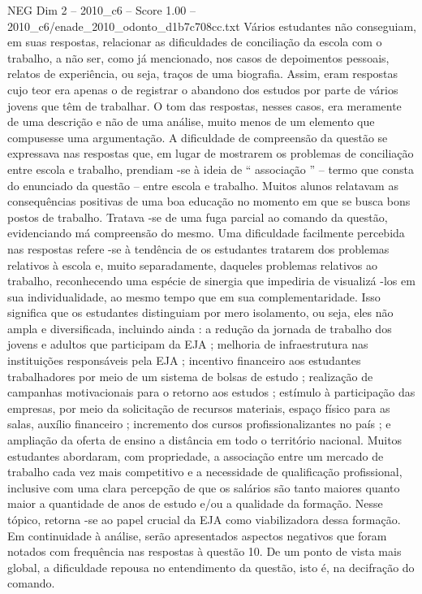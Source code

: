 \begin{textsample}{NEG Dim 2 – 2010\_c6 – Score 1.00 – 2010\_c6/enade\_2010\_odonto\_d1b7c708cc.txt}
Vários estudantes não conseguiam, em suas respostas, relacionar as dificuldades de conciliação da escola com o trabalho, a não ser, como já mencionado, nos casos de depoimentos pessoais, relatos de experiência, ou seja, traços de uma biografia.
Assim, eram respostas cujo teor era apenas o de registrar o abandono dos estudos por parte de vários jovens que têm de trabalhar.
O tom das respostas, nesses casos, era meramente de uma descrição e não de uma análise, muito menos de um elemento que compusesse uma argumentação.
A dificuldade de compreensão da questão se expressava nas respostas que, em lugar de mostrarem os problemas de conciliação entre escola e trabalho, prendiam -se à ideia de “ associação ” – termo que consta do enunciado da questão – entre escola e trabalho.
Muitos alunos relatavam as consequências positivas de uma boa educação no momento em que se busca bons postos de trabalho.
Tratava -se de uma fuga parcial ao comando da questão, evidenciando má compreensão do mesmo.
Uma dificuldade facilmente percebida nas respostas refere -se à tendência de os estudantes tratarem dos problemas relativos à escola e, muito separadamente, daqueles problemas relativos ao trabalho, reconhecendo uma espécie de sinergia que impediria de visualizá -los em sua individualidade, ao mesmo tempo que em sua complementaridade.
Isso significa que os estudantes distinguiam por mero isolamento, ou seja, eles não ampla e diversificada, incluindo ainda : a redução da jornada de trabalho dos jovens e adultos que participam da EJA ; melhoria de infraestrutura nas instituições responsáveis pela EJA ; incentivo financeiro aos estudantes trabalhadores por meio de um sistema de bolsas de estudo ; realização de campanhas motivacionais para o retorno aos estudos ; estímulo à participação das empresas, por meio da solicitação de recursos materiais, espaço físico para as salas, auxílio financeiro ; incremento dos cursos profissionalizantes no país ; e ampliação da oferta de ensino a distância em todo o território nacional.
Muitos estudantes abordaram, com propriedade, a associação entre um mercado de trabalho cada vez mais competitivo e a necessidade de qualificação profissional, inclusive com uma clara percepção de que os salários são tanto maiores quanto maior a quantidade de anos de estudo e/ou a qualidade da formação.
Nesse tópico, retorna -se ao papel crucial da EJA como viabilizadora dessa formação.
Em continuidade à análise, serão apresentados aspectos negativos que foram notados com frequência nas respostas à questão 10.
De um ponto de vista mais global, a dificuldade repousa no entendimento da questão, isto é, na decifração do comando.

\end{textsample}
